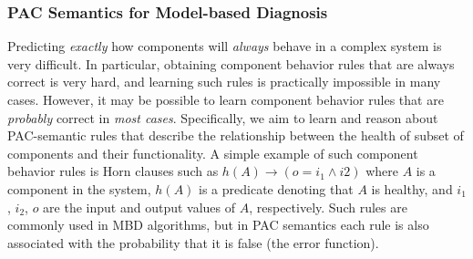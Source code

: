 \documentclass[12pt]{article}
\newcommand{\note}[1]{\textbf{\textit{#1}}}
\begin{document}




\subsubsection{PAC Semantics for Model-based Diagnosis}


Predicting {\em exactly} how components will {\em always} behave in a complex system is very difficult. In particular, obtaining component behavior rules that are always correct is very hard, and learning such rules is practically impossible in many cases. However, it may be possible to learn component behavior rules that are {\em probably} correct in {\em most cases}. Specifically, we aim to learn and reason about PAC-semantic rules that describe the relationship between 
the health of subset of components and their functionality. 
A simple example of such component behavior rules is Horn clauses such as $h(A)\rightarrow (o = i_1 \wedge i2)$
where $A$ is a component in the system, $h(A)$ is a predicate denoting that $A$ is healthy, and $i_1$, $i_2$, $o$ are the input and output values of $A$, respectively. Such rules are commonly used in MBD algorithms,
but in PAC semantics each rule is also associated with the probability that it is false (the error function). 
\end{document}
